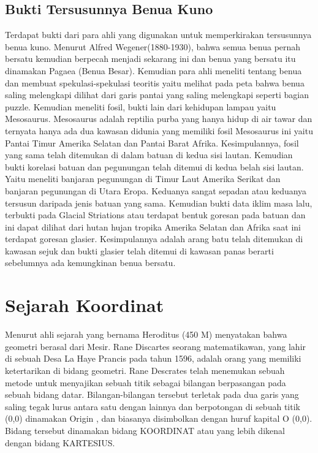 \subsection{Bukti Tersusunnya Benua Kuno}
Terdapat bukti dari para ahli yang digunakan untuk memperkirakan tersusunnya benua kuno.
Menurut Alfred Wegener(1880-1930), bahwa semua benua pernah bersatu kemudian berpecah menjadi sekarang ini dan benua yang bersatu itu dinamakan Pagaea (Benua Besar)\cite{hallam1975alfred}. Kemudian para ahli meneliti tentang benua dan membuat spekulasi-spekulasi teoritis yaitu melihat pada peta bahwa benua saling melengkapi dilihat dari garis pantai yang saling melengkapi seperti bagian puzzle. Kemudian meneliti fosil, bukti lain dari kehidupan lampau yaitu Mesosaurus. Mesosaurus adalah reptilia purba yang hanya hidup di air tawar dan ternyata hanya ada dua kawasan didunia yang memiliki fosil Mesosaurus ini yaitu Pantai Timur Amerika Selatan dan Pantai Barat Afrika. Kesimpulannya, fosil yang sama telah ditemukan di dalam batuan di kedua sisi lautan. Kemudian bukti korelasi batuan dan pegunungan telah ditemui di kedua belah sisi lautan. Yaitu meneliti banjaran pegunungan di Timur Laut Amerika Serikat dan banjaran pegunungan di Utara Eropa. Keduanya sangat sepadan atau keduanya tersusun daripada jenis batuan yang sama. Kemudian bukti data iklim masa lalu, terbukti pada Glacial Striations atau terdapat bentuk goresan pada batuan dan ini dapat dilihat dari hutan hujan tropika Amerika Selatan dan Afrika saat ini terdapat goresan glasier. Kesimpulannya adalah arang batu telah ditemukan di kawasan sejuk dan bukti glasier telah ditemui di kawasan panas berarti sebelumnya ada kemungkinan benua bersatu.

\section{Sejarah Koordinat}
Menurut ahli sejarah yang bernama Heroditus (450 M) menyatakan bahwa geometri berasal dari Mesir. Rane Discartes seorang matematikawan, yang lahir di sebuah Desa La Haye Prancis pada tahun 1596, adalah orang yang memiliki ketertarikan di bidang geometri. Rane Descrates telah menemukan sebuah metode untuk menyajikan sebuah titik sebagai bilangan berpasangan pada sebuah bidang datar. Bilangan-bilangan tersebut terletak pada dua garis yang saling tegak lurus antara satu dengan lainnya dan berpotongan di sebuah titik (0,0) dinamakan Origin , dan biasanya disimbolkan dengan huruf kapital O (0,0).
Bidang tersebut dinamakan bidang KOORDINAT atau yang lebih dikenal dengan bidang KARTESIUS.

